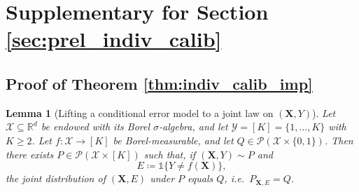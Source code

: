 \documentclass{article}
\theoremstyle{plain}
\newtheorem{lemma}[theorem]{Lemma}
\theoremstyle{definition}
\theoremstyle{remark}
\begin{document}



\newpage
\appendix
\onecolumn
\section{Supplementary for Section \ref{sec:prel_indiv_calib}}


\subsection{Proof of Theorem \ref{thm:indiv_calib_imp}}
\label{anex:pointwise_imp}

\begin{lemma}[Lifting a conditional error model to a joint law on $(\mathbf{X},Y)$]
\label{lem:lifting_XE_to_XY}
Let $\mathcal X\subseteq\mathbb R^d$ be endowed with its Borel $\sigma$-algebra, and let $\mathcal Y=[K]=\{1,\dots,K\}$ with $K\ge 2$.
Let $f:\mathcal X\to [K]$ be Borel-measurable, and let $Q\in\mathcal P(\mathcal X\times\{0,1\})$.
Then there exists $P\in\mathcal P(\mathcal X\times[K])$ such that, if $(\mathbf{X},Y)\sim P$ and
\[
E \coloneqq \mathds 1\{Y\neq f(\mathbf{X})\},
\]
the joint distribution of $(\mathbf{X},E)$ under $P$ equals $Q$, i.e.\ $P_{\mathbf{X},E}=Q$.
\end{lemma}
\end{document}
